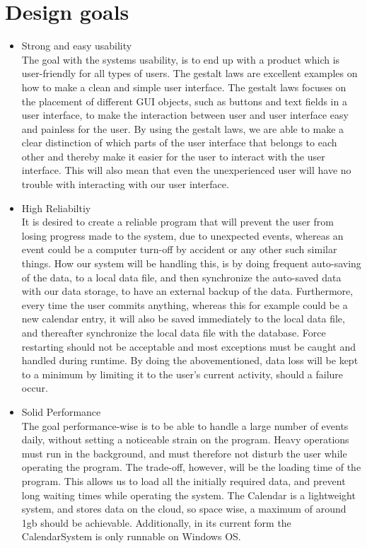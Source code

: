 \section{Design goals}
\begin{itemize}
\item Strong and easy usability\\
The goal with the systems usability, is to end up with a product which is user-friendly for all types of users. The gestalt laws are excellent examples on how to make a clean and simple user interface. The gestalt laws focuses on the placement of different GUI objects, such as buttons and text fields in a user interface, to make the interaction between user and user interface easy and painless for the user. By using the gestalt laws, we are able to make a clear distinction of which parts of the user interface that belongs to each other and thereby make it easier for the user to interact with the user interface. This will also mean that even the unexperienced user will have no trouble with interacting with our user interface.\\

\item High Reliabiltiy\\
It is desired to create a reliable program that will prevent the user from losing progress made to the system, due to unexpected events, whereas an event could be a computer turn-off by accident or any other such similar things. How our system will be handling this, is by doing frequent auto-saving of the data, to a local data file, and then synchronize the auto-saved data with our data storage, to have an external backup of the data. Furthermore, every time the user commits anything, whereas this for example could be a new calendar entry, it will also be saved immediately to the local data file, and thereafter synchronize the local data file with the database. Force restarting should not be acceptable and most exceptions must be caught and handled during runtime. By doing the abovementioned, data loss will be kept to a minimum by limiting it to the user’s current activity, should a failure occur.\\

\item Solid Performance\\
The goal performance-wise is to be able to handle a large number of events daily, without setting a noticeable strain on the program. Heavy operations must run in the background, and must therefore not disturb the user while operating the program. The trade-off, however, will be the loading time of the program. This allows us to load all the initially required data, and prevent long waiting times while operating the system. The Calendar is a lightweight system, and stores data on the cloud, so space wise, a maximum of around 1gb should be achievable. Additionally, in its current form the CalendarSystem is only runnable on Windows OS.\\


\end{itemize}
